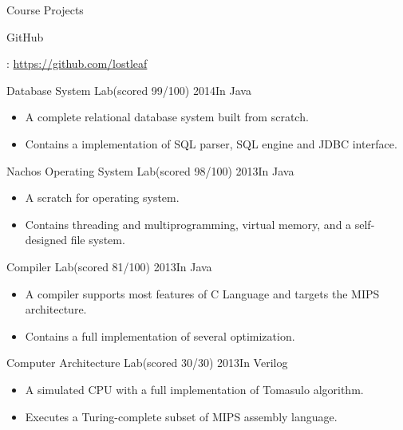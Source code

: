 \documentclass{resume} %
\begin{document}

\begin{rSection}{Course Projects}{\begin{bf}GitHub\end{bf}: \href{https://github.com/lostleaf?tab=repositories}{https://github.com/lostleaf}}

\begin{rSubsection}{Database System Lab}{(scored 99/100) 2014}{In Java}
\begin{itemize}
\item  A complete relational database system built from scratch. 
\item Contains a implementation of SQL parser, SQL engine and JDBC interface.
\end{itemize}
\end{rSubsection}
\begin{rSubsection}{Nachos Operating System Lab}{(scored 98/100) 2013}{In Java}
\begin{itemize}
\item A scratch for operating system.
\item Contains threading and multiprogramming, virtual memory, and a self-designed file system.
\end{itemize}
\end{rSubsection}
\begin{rSubsection}{Compiler Lab}{(scored 81/100) 2013}{In Java}
\begin{itemize}
\item A compiler supports most features of C Language and targets the MIPS architecture. 
\item Contains a full implementation of several optimization.
\end{itemize}
\end{rSubsection}
\begin{rSubsection}{Computer Architecture Lab}{(scored 30/30) 2013}{In Verilog}
\begin{itemize}
\item A simulated CPU with a full implementation of Tomasulo algorithm.
\item Executes a Turing-complete subset of MIPS assembly language.
\end{itemize}
\end{rSubsection}

\end{rSection}
\end{document}
